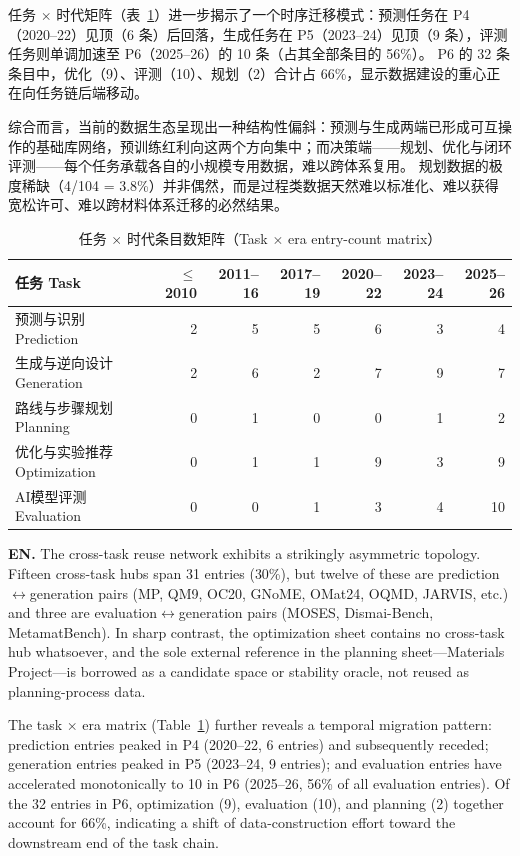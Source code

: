 \documentclass[11pt,a4paper]{ctexart}
\begin{document}
任务 $\times$ 时代矩阵（表~\ref{tab:matrix}）进一步揭示了一个时序迁移模式：预测任务在 P4（2020--22）见顶（6 条）后回落，生成任务在 P5（2023--24）见顶（9 条），评测任务则单调加速至 P6（2025--26）的 10 条（占其全部条目的 56\%）。
P6 的 32 条条目中，优化（9）、评测（10）、规划（2）合计占 66\%，显示数据建设的重心正在向任务链后端移动。

综合而言，当前的数据生态呈现出一种结构性偏斜：预测与生成两端已形成可互操作的基础库网络，预训练红利向这两个方向集中；而决策端——规划、优化与闭环评测——每个任务承载各自的小规模专用数据，难以跨体系复用。
规划数据的极度稀缺（4/104 = 3.8\%）并非偶然，而是过程类数据天然难以标准化、难以获得宽松许可、难以跨材料体系迁移的必然结果。

\begin{table}[h]
\centering\small
\caption{任务 $\times$ 时代条目数矩阵（Task $\times$ era entry-count matrix）}
\label{tab:matrix}
\begin{tabular}{@{}p{4.6cm}rrrrrr@{}}
\toprule
任务 Task & $\le$2010 & 2011--16 & 2017--19 & 2020--22 & 2023--24 & 2025--26 \\
\midrule
预测与识别 Prediction & 2 & 5 & 5 & 6 & 3 & 4 \\
生成与逆向设计 Generation & 2 & 6 & 2 & 7 & 9 & 7 \\
路线与步骤规划 Planning & 0 & 1 & 0 & 0 & 1 & 2 \\
优化与实验推荐 Optimization & 0 & 1 & 1 & 9 & 3 & 9 \\
AI模型评测 Evaluation & 0 & 0 & 1 & 3 & 4 & 10 \\
\bottomrule
\end{tabular}
\end{table}

\textbf{EN.} The cross-task reuse network exhibits a strikingly asymmetric topology. Fifteen cross-task hubs span 31 entries (30\%), but twelve of these are prediction$\leftrightarrow$generation pairs (MP, QM9, OC20, GNoME, OMat24, OQMD, JARVIS, etc.) and three are evaluation$\leftrightarrow$generation pairs (MOSES, Dismai-Bench, MetamatBench). In sharp contrast, the optimization sheet contains no cross-task hub whatsoever, and the sole external reference in the planning sheet---Materials Project---is borrowed as a candidate space or stability oracle, not reused as planning-process data.

The task $\times$ era matrix (Table~\ref{tab:matrix}) further reveals a temporal migration pattern: prediction entries peaked in P4 (2020--22, 6 entries) and subsequently receded; generation entries peaked in P5 (2023--24, 9 entries); and evaluation entries have accelerated monotonically to 10 in P6 (2025--26, 56\% of all evaluation entries). Of the 32 entries in P6, optimization (9), evaluation (10), and planning (2) together account for 66\%, indicating a shift of data-construction effort toward the downstream end of the task chain.
\end{document}
